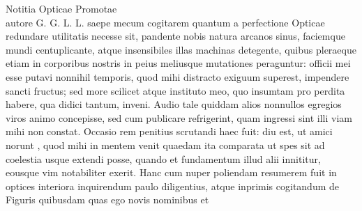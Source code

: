              \centering[16 r\textsuperscript{o}] Notitia Opticae Promotae\\ autore G. G.  L. L. \pend \vspace{1.0ex} \pstart {} saepe mecum cogitarem quantum a perfectione Opticae  redundare utilitatis necesse sit, pandente nobis natura arcanos sinus, faciemque mundi centuplicante, atque insensibiles illas machinas detegente, quibus pleraeque etiam in corporibus nostris in peius meliusque mutationes peraguntur: officii mei esse putavi nonnihil temporis, quod mihi  distracto exiguum superest, impendere  sancti fructus; sed more scilicet atque instituto meo, quo   insumtam pro perdita habere, qua didici tantum,  inveni. \pend \pstart Audio tale quiddam alios nonnullos egregios viros animo concepisse, sed cum publicare refrigerint, quam ingressi sint illi viam mihi non constat. Occasio rem penitius scrutandi haec fuit: diu est, ut amici norunt , quod mihi in mentem venit  quaedam  ita comparata ut spes sit ad coelestia usque extendi posse, quando et fundamentum illud alii innititur, eousque vim notabiliter exerit. \pend \pstart  Hanc cum nuper poliendam resumerem fuit in optices interiora inquirendum paulo diligentius, atque inprimis cogitandum de Figuris quibusdam quas ego novis nominibus  \protect{}\textso{, }\protect{} et 